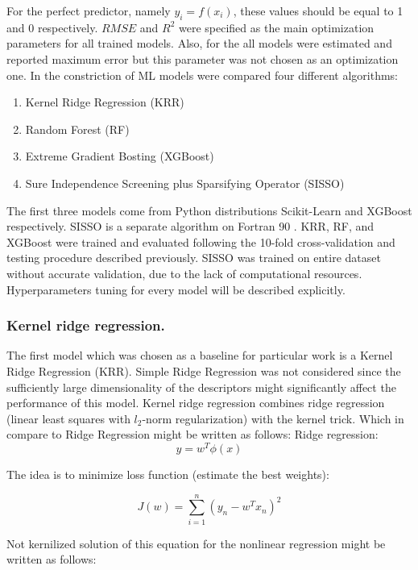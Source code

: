 For the perfect predictor, namely $y_i = f(x_i)$, these values should be equal to 1 and 0 respectively.
$RMSE$ and $R^2$ were specified as the main optimization parameters for all trained models. Also, for the all models were estimated and reported maximum error but this parameter was not chosen as an optimization one.
In the constriction of ML models were compared four different algorithms:
\begin{enumerate}
\item Kernel Ridge Regression (KRR)
\item Random Forest (RF)
\item Extreme Gradient Bosting (XGBoost)
\item Sure Independence Screening plus Sparsifying Operator (SISSO)
\end{enumerate}

The first three models come from Python distributions Scikit-Learn \cite{Pedregosa:2012tv} and XGBoost \cite{Chen_2016} respectively. SISSO is a separate algorithm on Fortran 90 \cite{Ouyang_2018, Ouyang_2019}. KRR, RF, and XGBoost were trained and evaluated following the 10-fold cross-validation and testing procedure described previously. SISSO was trained on entire dataset without accurate validation, due to the lack of computational resources. Hyperparameters tuning for every model will be described explicitly.

\subsubsection{Kernel ridge regression.}
The first model which was chosen as a baseline for particular work is a Kernel Ridge Regression (KRR). Simple Ridge Regression was not considered since the sufficiently large dimensionality of the descriptors might significantly affect the performance of this model.
Kernel ridge regression combines ridge regression (linear least squares with $l_2$-norm regularization) with the kernel trick. Which in compare to Ridge Regression might be written as follows:
Ridge regression:
\begin{equation}
y = w^T\phi(x)
\end{equation}

The idea is to minimize loss function (estimate the best weights):

\begin{equation}
J(w) = \sum \limits_{i=1}^{n}(y_n-w^Tx_n)^2
\end{equation}

Not kernilized solution of this equation for the nonlinear regression might be written as follows:

